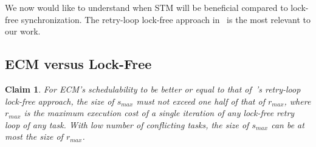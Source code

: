 \documentclass[12pt,english]{report}
\newtheorem{clm}{Claim}
\begin{document}
We now would like to understand when STM will be beneficial compared to lock-free synchronization. The retry-loop lock-free approach in~\cite{key-5} is the most relevant to our work. 


\subsection{\label{sub:G-EDF-scheduler-with}ECM versus Lock-Free}

\begin{clm}
For ECM's schedulability to be better or equal to that of~\cite{key-5}'s retry-loop lock-free approach,  
the size of $s_{max}$ must not exceed one half of that of $r_{max}$, where $r_{max}$ is the maximum execution cost of a single iteration of any lock-free retry loop of any task. With low number of conflicting tasks, the size of $s_{max}$ can be at most the size of $r_{max}$. 
\end{clm}
\end{document}
